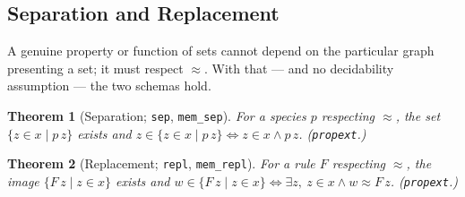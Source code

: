 \documentclass[11pt]{article}
\newtheorem{thm}{Theorem}[section]
\theoremstyle{remark}
\newcommand{\eq}{\approx}
\begin{document}
\subsection{Separation and Replacement}
A genuine property or function of sets cannot depend on the particular graph presenting a set; it
must respect $\eq$. With that --- and no decidability assumption --- the two schemas hold.
\begin{thm}[Separation; \texttt{sep}, \texttt{mem\_sep}]
For a species $p$ respecting $\eq$, the set $\{z\in x\mid p\,z\}$ exists and
$z\in\{z\in x\mid p\,z\}\iff z\in x\wedge p\,z$. (\texttt{propext}.)
\end{thm}
\begin{thm}[Replacement; \texttt{repl}, \texttt{mem\_repl}]
For a rule $F$ respecting $\eq$, the image $\{F\,z\mid z\in x\}$ exists and
$w\in\{F\,z\mid z\in x\}\iff\exists z,\ z\in x\wedge w\eq F\,z$. (\texttt{propext}.)
\end{thm}
\end{document}
